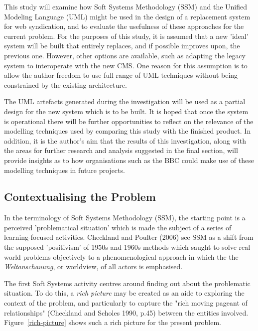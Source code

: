 \documentclass{article}
\begin{document}
This study will examine how Soft Systems Methodology (SSM) and the Unified Modeling Language (UML) might be used in the design of a replacement system for web syndication, and to evaluate the usefulness of these approaches for the current problem. For the purposes of this study, it is assumed that a new 'ideal' system will be built that entirely replaces, and if possible improves upon, the previous one. However, other options are available, such as adapting the legacy system to interoperate with the new CMS. One reason for this assumption is to allow the author freedom to use full range of UML techniques without being constrained by the existing architecture.

The UML artefacts generated during the investigation will be used as a partial design for the new system which is to be built. It is hoped that once the system is operational there will be further opportunities to reflect on the relevance of the modelling techniques used by comparing this study with the finished product. In addition, it is the author's aim that the results of this investigation, along with the areas for further research and analysis suggested in the final section, will provide insights as to how organisations such as the BBC could make use of these modelling techniques in future projects.

\subsection{Contextualising the Problem}

In the terminology of Soft Systems Methodology (SSM), the starting point is a perceived 'problematical situation' which is made the subject of a series of learning-focused activities. Checkland and Poulter (2006) see SSM as a shift from the supposed 'positivism' of 1950s and 1960s methods which saught to solve real-world problems objectively to a phenomenological approach in which the the \textit{Weltanschauung}, or worldview, of all actors is emphasised.

The first Soft Systems activity centres around finding out about the problematic situation. To do this, a \textit{rich picture} may be created as an aide to exploring the context of the problem, and particularly to capture the "rich moving pageant of relationships" (Checkland and Scholes 1990, p.45) between the entities involved. Figure~\ref{rich-picture} shows such a rich picture for the present problem. 
\end{document}
